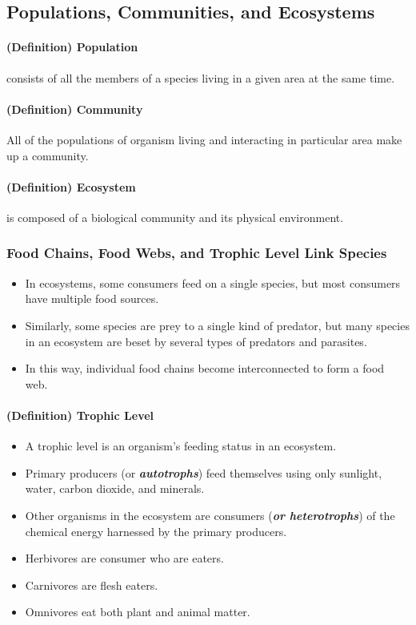 \documentclass[10pt]{article}
\begin{document}
\subsection{Populations, Communities, and Ecosystems}
\paragraph{(Definition) Population} consists of all the members of a species living in a given area at the same time. 
\paragraph{(Definition) Community} All of the populations of organism living and interacting in particular area make up a community.
\paragraph{(Definition) Ecosystem} is composed of a biological community and its physical environment. 

\subsubsection{Food Chains, Food Webs, and Trophic Level Link Species}
\begin{itemize}
    \item In ecosystems, some consumers feed on a single species, but most consumers have multiple food sources. 
    \item Similarly, some species are prey to a single kind of predator, but many species in an ecosystem are beset by several types of predators and parasites. 
    \item In this way, individual food chains become interconnected to form a food web.
\end{itemize}

\paragraph{(Definition) Trophic Level}
\begin{itemize}
    \item A trophic level is an organism's feeding status in an ecosystem.
    \item Primary producers (or \textit{\textbf{autotrophs}}) feed themselves using only sunlight, water, carbon dioxide, and minerals. 
    \item Other organisms in the ecosystem are consumers (\textit{\textbf{or heterotrophs}}) of the chemical energy harnessed by the primary producers. 
    \item Herbivores are consumer who are eaters.
    \item Carnivores are flesh eaters. 
    \item Omnivores eat both plant and animal matter. 
\end{itemize}
\end{document}

